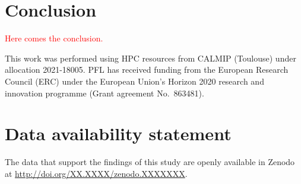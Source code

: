 \documentclass[aip,jcp,reprint,noshowkeys,superscriptaddress]{revtex4-1}
\newcommand{\titou}[1]{\textcolor{red}{#1}}
\begin{document}
\section{Conclusion}

\titou{Here comes the conclusion.}

\begin{acknowledgements}
This work was performed using HPC resources from CALMIP (Toulouse) under allocation 2021-18005.
PFL has received funding from the European Research Council (ERC) under the European Union's Horizon 2020 research and innovation programme (Grant agreement No.~863481).
\end{acknowledgements}

\section*{Data availability statement}
The data that support the findings of this study are openly available in Zenodo at \href{http://doi.org/XX.XXXX/zenodo.XXXXXXX}{http://doi.org/XX.XXXX/zenodo.XXXXXXX}.


\end{document}
